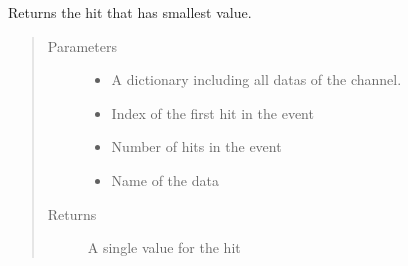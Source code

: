 \documentclass[letterpaper,10pt,english]{sphinxmanual}
\begin{document}
\begin{fulllineitems}
\label{\detokenize{autodocs/data:listmode.data.min_combinator}}
\sphinxAtStartPar
Returns the hit that has smallest value.
\begin{quote}\begin{description}
\item[{Parameters}] \leavevmode\begin{itemize}
\item {} 
\sphinxAtStartPar
{} \textendash{} A dictionary including all datas of the channel.

\item {} 
\sphinxAtStartPar
{} \textendash{} Index of the first hit in the event

\item {} 
\sphinxAtStartPar
{} \textendash{} Number of hits in the event

\item {} 
\sphinxAtStartPar
{} \textendash{} Name of the data

\end{itemize}

\item[{Returns}] \leavevmode
\sphinxAtStartPar
A single value for the hit

\end{description}\end{quote}

\end{fulllineitems}

\end{document}
